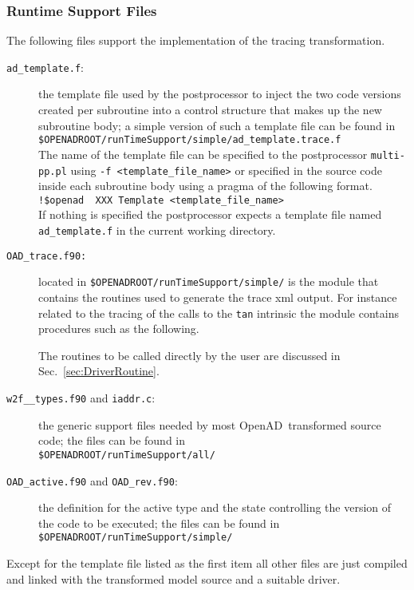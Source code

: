 \documentclass{article}
\newcommand{\openad}{OpenAD}
\newcommand{\refsec}[1]{{Sec.~\ref{#1}}}
\begin{document}
\subsubsection{Runtime Support Files}
The following files support the implementation of the tracing transformation.
\begin{description}
\item[{\tt ad\_template.f}:] the template file used by the postprocessor to inject the two code versions created per 
subroutine into a control structure that makes up the new subroutine body; a simple version of such a template file 
can be found in\\[1ex]   
\hspace*{1cm}\lstinline{$OPENADROOT/runTimeSupport/simple/ad_template.trace.f} \\[1ex]%
The name of the template file can be specified to the postprocessor \lstinline{multi-pp.pl} using
\lstinline{-f <template_file_name>} or specified in the source code inside each subroutine body using 
a pragma of the following format. \\[1ex]
\hspace*{1cm}\lstinline{!$openad  XXX Template <template_file_name>} \\[1ex]%
If nothing is specified the postprocessor expects a template file named \lstinline{ad_template.f} in the 
current working directory.  \\[1ex]
\item[{\tt OAD\_trace.f90:}] located in \lstinline{$OPENADROOT/runTimeSupport/simple/} %
is the module that contains 
the routines used to generate the trace xml output. For instance related to the tracing of 
the calls to the \lstinline{tan} intrinsic the module contains procedures such as the following.

The routines to be called directly by the user are discussed in \refsec{sec:DriverRoutine}.
\item[{\tt w2f\_\_types.f90} and {\tt iaddr.c}:] the generic support files needed by most \openad\ transformed source code;
the files can be found in \\[1ex]
\hspace*{1cm}\lstinline{$OPENADROOT/runTimeSupport/all/}%
\item[{\tt OAD\_active.f90} and {\tt OAD\_rev.f90}:] the definition for the active type and the state 
controlling the version of the code to be executed;
the files can be found in \\[1ex]
\hspace*{1cm}\lstinline{$OPENADROOT/runTimeSupport/simple/}%
\end{description}
Except for the template file listed as the first item all other files are just compiled and linked 
with the transformed model source and a suitable driver.
\end{document}
